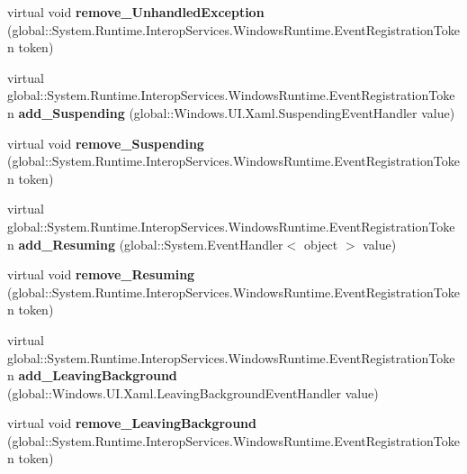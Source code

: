 \begin{DoxyCompactItemize}
virtual void {\bfseries remove\+\_\+\+Unhandled\+Exception} (global\+::\+System.\+Runtime.\+Interop\+Services.\+Windows\+Runtime.\+Event\+Registration\+Token token)
\item 
\mbox{\label{class_windows_1_1_u_i_1_1_xaml_1_1_application_ac22db715c72a7c090a65a2657417c4e6}} 
virtual global\+::\+System.\+Runtime.\+Interop\+Services.\+Windows\+Runtime.\+Event\+Registration\+Token {\bfseries add\+\_\+\+Suspending} (global\+::\+Windows.\+U\+I.\+Xaml.\+Suspending\+Event\+Handler value)
\item 
\mbox{\label{class_windows_1_1_u_i_1_1_xaml_1_1_application_a697beee9101ae37839824e38fb697688}} 
virtual void {\bfseries remove\+\_\+\+Suspending} (global\+::\+System.\+Runtime.\+Interop\+Services.\+Windows\+Runtime.\+Event\+Registration\+Token token)
\item 
\mbox{\label{class_windows_1_1_u_i_1_1_xaml_1_1_application_aebc7735fefc7c00f75274d1e1dad4cc1}} 
virtual global\+::\+System.\+Runtime.\+Interop\+Services.\+Windows\+Runtime.\+Event\+Registration\+Token {\bfseries add\+\_\+\+Resuming} (global\+::\+System.\+Event\+Handler$<$ object $>$ value)
\item 
\mbox{\label{class_windows_1_1_u_i_1_1_xaml_1_1_application_ae71f03dad163a08e042d3b65126ad419}} 
virtual void {\bfseries remove\+\_\+\+Resuming} (global\+::\+System.\+Runtime.\+Interop\+Services.\+Windows\+Runtime.\+Event\+Registration\+Token token)
\item 
\mbox{\label{class_windows_1_1_u_i_1_1_xaml_1_1_application_a652fc06a2f576820519f4a6302fa3a92}} 
virtual global\+::\+System.\+Runtime.\+Interop\+Services.\+Windows\+Runtime.\+Event\+Registration\+Token {\bfseries add\+\_\+\+Leaving\+Background} (global\+::\+Windows.\+U\+I.\+Xaml.\+Leaving\+Background\+Event\+Handler value)
\item 
\mbox{\label{class_windows_1_1_u_i_1_1_xaml_1_1_application_a33a3ccc165dd32a08e6cbc543ea18565}} 
virtual void {\bfseries remove\+\_\+\+Leaving\+Background} (global\+::\+System.\+Runtime.\+Interop\+Services.\+Windows\+Runtime.\+Event\+Registration\+Token token)

\end{DoxyCompactItemize}
